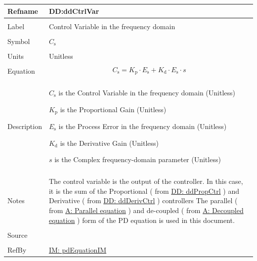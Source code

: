 \documentclass[12pt]{article}
\begin{document}
\vspace{\baselineskip}
\noindent
\begin{minipage}{\textwidth}
\begin{tabular}{>{\raggedright}p{}>{\raggedright\arraybackslash}p{}}
\toprule \textbf{Refname} & \textbf{DD:ddCtrlVar}
\label{DD:ddCtrlVar}
\\ \midrule \\
Label & Control Variable in the frequency domain
        
\\ \midrule \\
Symbol & ${C_{\text{s}}}$
         
\\ \midrule \\
Units & Unitless
        
\\ \midrule \\
Equation & \begin{displaymath}
           {C_{\text{s}}}={K_{\text{p}}}\cdot{}{E_{\text{s}}}+{K_{\text{d}}}\cdot{}{E_{\text{s}}}\cdot{}s
           \end{displaymath}
\\ \midrule \\
Description & \begin{symbDescription}
              \item{${C_{\text{s}}}$ is the Control Variable in the frequency domain (Unitless)}
              \item{${K_{\text{p}}}$ is the Proportional Gain (Unitless)}
              \item{${E_{\text{s}}}$ is the Process Error in the frequency domain (Unitless)}
              \item{${K_{\text{d}}}$ is the Derivative Gain (Unitless)}
              \item{$s$ is the Complex frequency-domain parameter (Unitless)}
              \end{symbDescription}
\\ \midrule \\
Notes & The control variable is the output of the controller. In this case, it is the sum of the Proportional ( from \hyperref[DD:ddPropCtrl]{DD: ddPropCtrl} ) and Derivative ( from  \hyperref[DD:ddDerivCtrl]{DD: ddDerivCtrl} ) controllers The parallel ( from \hyperref[parallelEq]{A: Parallel equation} ) and de-coupled ( from \hyperref[decoupled]{A: Decoupled equation} ) form of the PD equation is used in this document.
        
\\ \midrule \\
Source & \cite{johnson2008}
         
\\ \midrule \\
RefBy & \hyperref[IM:pdEquationIM]{IM: pdEquationIM}
        
\\ \bottomrule
\end{tabular}
\end{minipage}
\end{document}
